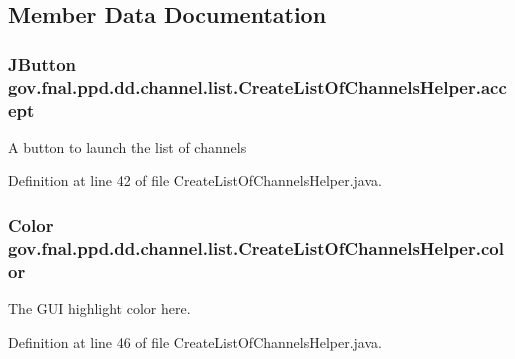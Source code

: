 \subsection{Member Data Documentation}
\hypertarget{classgov_1_1fnal_1_1ppd_1_1dd_1_1channel_1_1list_1_1CreateListOfChannelsHelper_a9ee26ae63feb90e8fbf691e14b94ddec}{
\subsubsection[{accept}]{\setlength{\rightskip}{0pt plus 5cm}J\-Button gov.\-fnal.\-ppd.\-dd.\-channel.\-list.\-Create\-List\-Of\-Channels\-Helper.\-accept}}\label{classgov_1_1fnal_1_1ppd_1_1dd_1_1channel_1_1list_1_1CreateListOfChannelsHelper_a9ee26ae63feb90e8fbf691e14b94ddec}
A button to launch the list of channels 

Definition at line 42 of file Create\-List\-Of\-Channels\-Helper.\-java.

\hypertarget{classgov_1_1fnal_1_1ppd_1_1dd_1_1channel_1_1list_1_1CreateListOfChannelsHelper_aa374f73b8da23d1ff27a3faad1a1f678}{
\subsubsection[{color}]{\setlength{\rightskip}{0pt plus 5cm}Color gov.\-fnal.\-ppd.\-dd.\-channel.\-list.\-Create\-List\-Of\-Channels\-Helper.\-color}}\label{classgov_1_1fnal_1_1ppd_1_1dd_1_1channel_1_1list_1_1CreateListOfChannelsHelper_aa374f73b8da23d1ff27a3faad1a1f678}
The G\-U\-I highlight color here. 

Definition at line 46 of file Create\-List\-Of\-Channels\-Helper.\-java.

